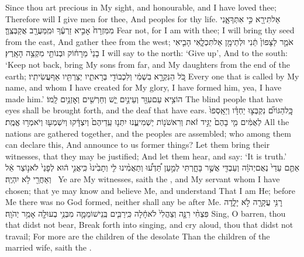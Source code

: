 {Since thou art precious in My sight, and honourable, and I have loved thee; Therefore will I give men for thee, And peoples for thy life.}
{אַל\maqqaf תִּירָ֖א כִּ֣י אִתְּךָ\maqqaf אָ֑נִי מִמִּזְרָח֙ אָבִ֣יא זַרְעֶ֔ךָ וּמִֽמַּעֲרָ֖ב אֲקַבְּצֶֽךָּ׃}
{Fear not, for I am with thee; I will bring thy seed from the east, And gather thee from the west;}
{אֹמַ֤ר לַצָּפוֹן֙ תֵּ֔נִי וּלְתֵימָ֖ן אַל\maqqaf תִּכְלָ֑אִי הָבִ֤יאִי בָנַי֙ מֵרָח֔וֹק וּבְנוֹתַ֖י מִקְצֵ֥ה הָאָֽרֶץ׃}
{I will say to the north: ‘Give up’, And to the south: ‘Keep not back, bring My sons from far, and My daughters from the end of the earth;}
{כֹּ֚ל הַנִּקְרָ֣א בִשְׁמִ֔י וְלִכְבוֹדִ֖י בְּרָאתִ֑יו יְצַרְתִּ֖יו אַף\maqqaf עֲשִׂיתִֽיו׃}
{Every one that is called by My name, and whom I have created for My glory, I have formed him, yea, I have made him.’}
{הוֹצִ֥יא עַם\maqqaf עִוֵּ֖ר וְעֵינַ֣יִם יֵ֑שׁ וְחֵרְשִׁ֖ים וְאׇזְנַ֥יִם לָֽמוֹ׃}
{The blind people that have eyes shall be brought forth, and the deaf that have ears.}
{כׇּֽל\maqqaf הַגּוֹיִ֞ם נִקְבְּצ֣וּ יַחְדָּ֗ו וְיֵאָֽסְפוּ֙ לְאֻמִּ֔ים מִ֤י בָהֶם֙ יַגִּ֣יד זֹ֔את וְרִאשֹׁנ֖וֹת יַשְׁמִיעֻ֑נוּ יִתְּנ֤וּ עֵֽדֵיהֶם֙ וְיִצְדָּ֔קוּ וְיִשְׁמְע֖וּ וְיֹאמְר֥וּ אֱמֶֽת׃}
{All the nations are gathered together, and the peoples are assembled; who among them can declare this, And announce to us former things? Let them bring their witnesses, that they may be justified; And let them hear, and say: ‘It is truth.’}
{אַתֶּ֤ם עֵדַי֙ נְאֻם\maqqaf יְהֹוָ֔ה וְעַבְדִּ֖י אֲשֶׁ֣ר בָּחָ֑רְתִּי לְמַ֣עַן תֵּ֠דְע֠וּ וְתַאֲמִ֨ינוּ לִ֤י וְתָבִ֙ינוּ֙ כִּֽי\maqqaf אֲנִ֣י ה֔וּא לְפָנַי֙ לֹא\maqqaf נ֣וֹצַר אֵ֔ל וְאַחֲרַ֖י לֹ֥א יִהְיֶֽה׃ \setuma }
{Ye are My witnesses, saith the \lord, and My servant whom I have chosen; that ye may know and believe Me, and understand That I am He; before Me there was no God formed, neither shall any be after Me.}
\newperek
{}
\label{haft_2}
\setcounter{chap}{54}
\setcounter{verse}{1}
{רׇנִּ֥י עֲקָרָ֖ה לֹ֣א יָלָ֑דָה פִּצְחִ֨י רִנָּ֤ה וְצַהֲלִי֙ לֹא\maqqaf חָ֔לָה כִּֽי\maqqaf רַבִּ֧ים בְּֽנֵי\maqqaf שׁוֹמֵמָ֛ה מִבְּנֵ֥י בְעוּלָ֖ה אָמַ֥ר יְהֹוָֽה׃}
{Sing, O barren, thou that didst not bear, Break forth into singing, and cry aloud, thou that didst not travail; For more are the children of the desolate Than the children of the married wife, saith the \lord.}
